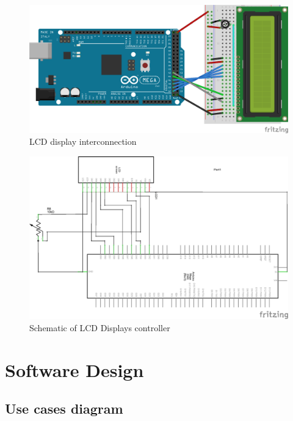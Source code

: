 \begin{figure}[H]
	\centering
	\includegraphics[width=\maxwidth{15cm}, keepaspectratio]{Chapters/Fig/deltarobot_LCD_16x2.png}
	\caption{LCD display interconnection}
	\label{fig:deltarobot_LCD_16x2}
\end{figure}

\begin{figure}[H]
	\centering
	\includegraphics[width=\maxwidth{15cm}, keepaspectratio]{Chapters/Fig/Deltarobot_LCD_16x2_schem.png}
	\caption{Schematic of LCD Displays controller}
	\label{fig:Deltarobot_LCD_16x2_schem}
\end{figure}
\section{Software Design}

\subsection{Use cases diagram}
